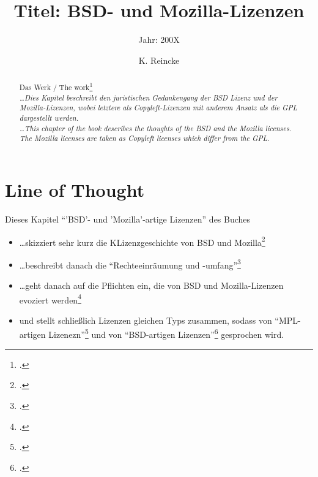 \documentclass[DIV=calc,BCOR=5mm,11pt,headings=small,oneside,abstract=true, toc=bib]{scrartcl}
\begin{document}

\titlehead{Literaturexzerpt}
\subject{Autor(en): Arl etc.}
\title{Titel: BSD- und Mozilla-Lizenzen}
\subtitle{Jahr: 200X }
\author{K. Reincke}

\maketitle

\begin{abstract}
Das Werk / The work\footcite[][]{ArlBriVol2004a} \\
\noindent \itshape
\ldots Dies Kapitel beschreibt den juristischen Gedankengang der BSD Lizenz und
der Mozilla-Lizenzen, wobei letztere als Copyleft-Lizenzen mit anderem Ansatz
als die GPL dargestellt werden. \\
\noindent
\ldots This chapter of the book describes the thoughts of the BSD and the
Mozilla licenses. The Mozilla licenses are taken as Copyleft licenses which
differ from the GPL.
\end{abstract}
\footnotesize
\normalsize

\section{Line of Thought}

Dieses Kapitel \enquote{'BSD'- und 'Mozilla'-artige Lizenzen} des Buches

\begin{itemize}
  \item \ldots skizziert sehr kurz die KLizenzgeschichte von BSD und
  Mozilla\footcite[vgl.][318ff]{ArlBriVol2004a}
  \item \ldots beschreibt danach die \enquote{Rechteeinräumung und
  -umfang}\footcite[vgl.][323ff]{ArlBriVol2004a}
  \item \ldots geht danach auf die Pflichten ein, die von BSD und
  Mozilla-Lizenzen evoziert werden\footcite[vgl.][342ff]{ArlBriVol2004a}
  \item und stellt schließlich Lizenzen gleichen Typs zusammen, sodass von
  \enquote{MPL-artigen Lizenezn}\footcite[vgl.][361ff]{ArlBriVol2004a} und
  von \enquote{BSD-artigen Lizenzen}\footcite[vgl.][364ff]{ArlBriVol2004a}
  gesprochen wird.
\end{itemize}
\end{document}
